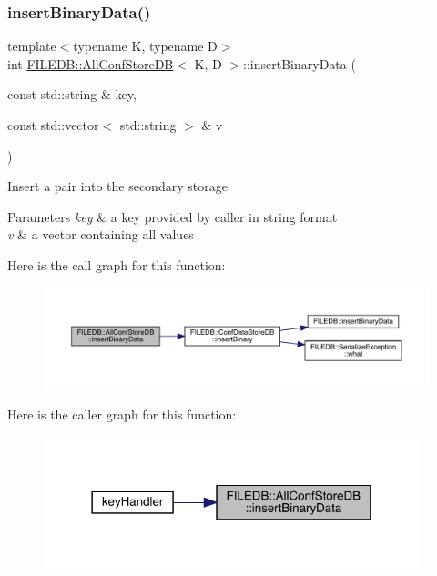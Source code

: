 \subsubsection{\texorpdfstring{insertBinaryData()}{insertBinaryData()}\hspace{0.1cm}{\footnotesize\ttfamily [2/2]}}
{\footnotesize\ttfamily template$<$typename K, typename D$>$ \\
int \mbox{\hyperlink{classFILEDB_1_1AllConfStoreDB}{F\+I\+L\+E\+D\+B\+::\+All\+Conf\+Store\+DB}}$<$ K, D $>$\+::insert\+Binary\+Data (\begin{DoxyParamCaption}\item[{const std\+::string \&}]{key,  }\item[{const std\+::vector$<$ std\+::string $>$ \&}]{v }\end{DoxyParamCaption})\hspace{0.3cm}{\ttfamily [inline]}}

Insert a pair into the secondary storage 
\begin{DoxyParams}{Parameters}
{\em key} & a key provided by caller in string format \\
\hline
{\em v} & a vector containing all values \\
\hline
\end{DoxyParams}
Here is the call graph for this function\+:
\nopagebreak
\begin{figure}[H]
\begin{center}
\leavevmode
\includegraphics[width=350pt]{df/db6/classFILEDB_1_1AllConfStoreDB_ac2c898624d4b32c526951edfb6271d60_cgraph}
\end{center}
\end{figure}
Here is the caller graph for this function\+:\nopagebreak
\begin{figure}[H]
\begin{center}
\leavevmode
\includegraphics[width=309pt]{df/db6/classFILEDB_1_1AllConfStoreDB_ac2c898624d4b32c526951edfb6271d60_icgraph}
\end{center}
\end{figure}
\mbox{\label{classFILEDB_1_1AllConfStoreDB_a9150983c712d6b870a75886f92b10a9d}} 
